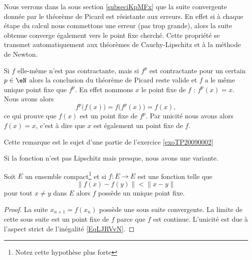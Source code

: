\begin{remark}
    Nous verrons dans la sous section \ref{subseciKpMFx} que la suite convergente donnée par le théorème de Picard est résistante aux erreurs. En effet si à chaque étape du calcul nous commettons une erreur (pas trop grande), alors la suite obtenue converge également vers le point fixe cherché. Cette propriété se transmet automatiquement aux théorèmes de Cauchy-Lipschitz et à la méthode de Newton.
\end{remark}

\begin{remark}  \label{remIOHUJm}
    Si \( f\) elle-même n'est pas contractante, mais si \( f^p\) est contractante pour un certain \( p\in \eN\) alors la conclusion du théorème de Picard reste valide et \( f\) a le même unique point fixe que \( f^p\). En effet nommons \( x\) le point fixe de \( f\) : \( f^p(x)=x\). Nous avons alors
    \begin{equation}
        f^p\big( f(x) \big)=f\big( f^p(x) \big)=f(x),
    \end{equation}
    ce qui prouve que \( f(x)\) est un point fixe de \( f^p\). Par unicité nous avons alors \( f(x)=x\), c'est à dire que \( x\) est également un point fixe de \( f\).

    Cette remarque est le sujet d'une partie de l'exercice \ref{exoTP20090002}
\end{remark}

Si la fonction n'est pas Lipschitz mais presque, nous avons une variante.
\begin{proposition}
    Soit \( E\) un ensemble compact\footnote{Notez cette hypothèse plus forte} et si \( f\colon E\to E\) est une fonction telle que
    \begin{equation}        \label{EqLJRVvN}
        \| f(x)-f(y) \|< \| x-y \|
    \end{equation}
    pour tout \( x\neq y\) dans \( E\) alors \( f\) possède un unique point fixe.
\end{proposition}

\begin{proof}
    La suite \( x_{n+1}=f(x_n)\) possède une sous suite convergente. La limite de cette sous suite est un point fixe de \( f\) parce que \( f\) est continue. L'unicité est due à l'aspect strict de l'inégalité \eqref{EqLJRVvN}.
\end{proof}

